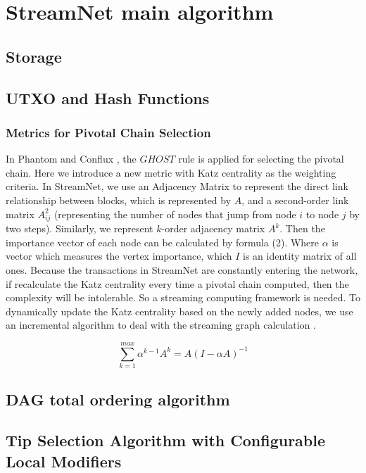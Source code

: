 \section{StreamNet main algorithm}

\subsection{Storage}

\subsection{UTXO and Hash Functions}
\subsubsection{Metrics for Pivotal Chain Selection}
In Phantom \cite{sompolinskyphantom} and Conflux \cite{li2018scaling}, the $GHOST$ rule \cite{sompolinsky2015secure} is applied for selecting the pivotal chain.
Here we introduce a new metric with Katz centrality \cite{katz1953new} as the weighting criteria. 
In StreamNet, we use an Adjacency Matrix to represent the direct link relationship between blocks, which is represented by $A$,
and a second-order link matrix $A^2_{ij}$ (representing the number of nodes that jump from node $i$ to node $j$ by two steps).
Similarly, we represent $k$-order adjacency matrix $A^k$.
Then the importance vector of each node can be calculated by formula (2). 
Where $\alpha$ is vector which measures the vertex importance, which $I$ is an identity matrix of all ones.
Because the transactions in StreamNet are constantly entering the network, 
if recalculate the Katz centrality every time a pivotal chain computed, 
then the complexity will be intolerable. 
So a streaming computing framework is needed. 
To dynamically update the Katz centrality based on the newly added nodes, 
we use an incremental algorithm to deal with the streaming graph calculation \cite{nathan2018incrementally}.

\begin{equation}
\label{simple_equation}
\sum_{k=1}^{max} \alpha^{k-1}A^{k}=A(I-\alpha A)^{-1}
\end{equation}

\subsection{DAG total ordering algorithm}

\subsection{Tip Selection Algorithm with Configurable Local Modifiers}


